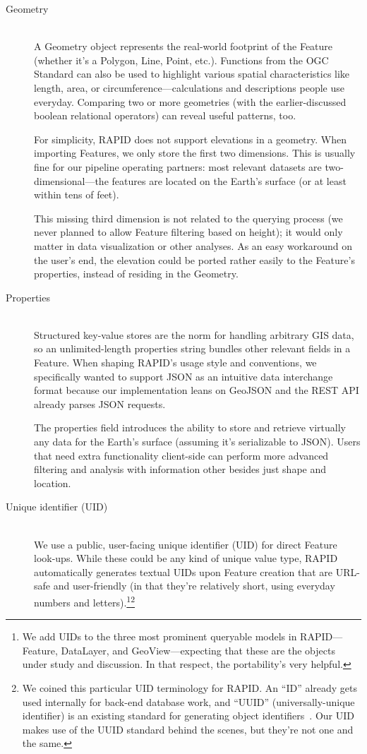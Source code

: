 \begin{description}
  \item[Geometry] \hfill \\
  A Geometry object represents the real-world footprint of the Feature (whether it's a Polygon, Line, Point, etc.). Functions from the OGC Standard can also be used to highlight various spatial characteristics like length, area, or circumference---calculations and descriptions people use everyday. Comparing two or more geometries (with the earlier-discussed boolean relational operators) can reveal useful patterns, too.
   
   For simplicity, RAPID does not support elevations in a geometry. When importing Features, we only store the first two dimensions. This is usually fine for our pipeline operating partners: most relevant datasets are two-dimensional---the features are located on the Earth's surface (or at least within tens of feet).
   
   This missing third dimension is not related to the querying process (we never planned to allow Feature filtering based on height); it would only matter in data visualization or other analyses. As an easy workaround on the user's end, the elevation could be ported rather easily to the Feature's properties, instead of residing in the Geometry.
  
  \item[Properties] \hfill \\
  Structured key-value stores are the norm for handling arbitrary GIS data, so an unlimited-length properties string bundles other relevant fields in a Feature. When shaping RAPID's usage style and conventions, we specifically wanted to support JSON as an intuitive data interchange format because our implementation leans on GeoJSON and the REST API already parses JSON requests.
  
  The properties field introduces the ability to store and retrieve virtually any data for the Earth's surface (assuming it's serializable to JSON). Users that need extra functionality client-side can perform more advanced filtering and analysis with information other besides just shape and location.
  
  \item[Unique identifier (UID)] \hfill \\
  We use a public, user-facing unique identifier (UID) for direct Feature look-ups. While these could be any kind of unique value type, RAPID automatically generates textual UIDs upon Feature creation that are URL-safe and user-friendly (in that they're relatively short, using everyday numbers and letters).\footnote{We add UIDs to the three most prominent queryable models in RAPID---Feature, DataLayer, and GeoView---expecting that these are the objects under study and discussion. In that respect, the portability's very helpful.}\footnote{We coined this particular UID terminology for RAPID. An ``ID'' already gets used internally for back-end database work, and ``UUID'' (universally-unique identifier) is an existing standard for generating object identifiers~\cite{Leach}. Our UID makes use of the UUID standard behind the scenes, but they're not one and the same.}
  

\end{description}
